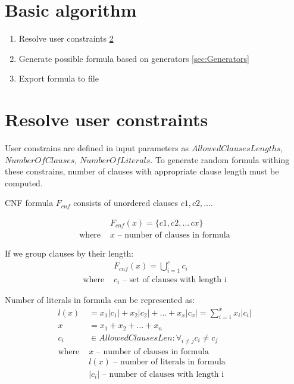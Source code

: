 \section{Basic algorithm}

\begin{enumerate}
  \item Resolve user constraints \ref{sec:ResolveUserConstrains}
  \item Generate possible formula based on generators \ref{sec:Generators}
  \item Export formula to file
\end{enumerate}

\section{Resolve user constraints}
\label{sec:ResolveUserConstrains}

User constrains are defined in input parameters as $AllowedClausesLengths$, $NumberOfClauses$, $NumberOfLiterals$. To generate random formula withing these constrains, number of clauses with appropriate clause length must be computed.

CNF formula $F_{cnf}$ consists of unordered clauses $c1, c2, \dots$. 

\begin{align*}
	&F_{cnf}(x) = \{c1, c2, \dots\, cx\} \\
	\text{where }
		&x \text{ -- number of clauses in formula}
\end{align*}

If we group clauses by their length:
\begin{align*}
	&F_{cnf}(x) = \bigcup_{i=1}^c c_i \\
	\text{where }
		&c_i \text{ -- set of clauses with length i} 
\end{align*}

Number of literals in formula can be represented as:
\begin{align*}
	l(x) &= x_1|c_1| + x_2|c_2| + \dots + x_x|c_x| = \sum_{i=1}^{x} x_i |c_i| \\
	x &= x_1 + x_2 + \dots + x_n \\
	c_i &\in AllowedClausesLen: \forall_{i \neq j} c_i \neq c_j  \\
	\text{where }
		&x \text{ -- number of clauses in formula} \\ 
		&l(x) \text{ -- number of literals in formula} \\ 
		&|c_i| \text{ -- number of clauses with length i} 
\end{align*}

